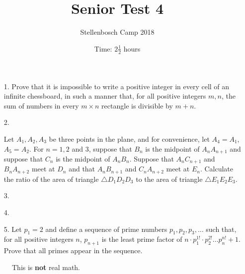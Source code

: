 \documentclass[a4paper, 12pt]{article}
\title{Senior Test 4}
\author{Stellenbosch Camp 2018}
\date{Time: $2 \frac{1}{2}$ hours}
\begin{document}
 \maketitle

\begin{enumerate}

\item[1.]  Prove that it is impossible to write a positive integer in every cell of an infinite chessboard, in such a manner that, for all positive integers $m, n$, the sum of numbers in every $m\times n$ rectangle is divisible by $m + n$.


\vspace{7pt}

% 
\item[2.] 

Let $A_1, A_2, A_3$ be three points in the plane, and for convenience, let $A_4 = A_1$, $A_5 = A_2$. For $n = 1, 2$ and $3$, suppose that $B_n$ is the midpoint of $A_n A_{n+1}$ and suppose that $C_n$ is the midpoint of $A_n B_n$. Suppose that $A_n C_{n+1}$ and $B_n A_{n+2}$ meet at $D_n$ and that $A_n B_{n+1}$ and $C_n A_{n+2}$ meet at $E_n$. Calculate the ratio of the area of triangle $\triangle D_1 D_2 D_3$ to the area of triangle $\triangle E_1 E_2 E_3$.

\vspace{5pt}

\item[3.]  

\vspace{7pt}

\item[4.]


\vspace{7pt}

\item[5.]   Let $p_1 = 2$ and define a sequence of prime numbers $p_1, p_2, p_3, \dots$ such that, for all positive integers $n$, $p_{n+1}$ is the least prime factor of $n \cdot p_1^{1!} \cdot p_2^{2!} \dots p_n^{n!} + 1$. Prove that all primes appear in the sequence.



\end{enumerate}

\vfill

\begin{figure}[h]
	\centering
{}
\caption{This is \textbf{not} real math.}
\end{figure}

\vspace{12mm}
\end{document}
